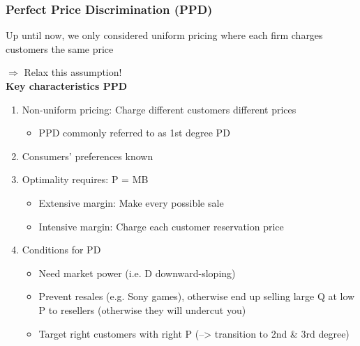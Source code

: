 \documentclass[10pt]{beamer}
\begin{document}
\begin{frame} 
	\frametitle{Perfect Price Discrimination (PPD)}
	
	Up until now, we only considered uniform pricing where each firm charges customers the same price
	
	\smallskip
	$\Longrightarrow$ Relax this assumption!\\
	\bigskip
	\textbf{Key characteristics PPD}
	\begin{enumerate}
		\item Non-uniform pricing: Charge different customers different prices
			\begin{itemize}
				\item PPD commonly referred to as 1st degree PD
			\end{itemize}
		\item Consumers' preferences known
		\item Optimality requires: P = MB %
			\begin{itemize}
				\item Extensive margin: Make every possible sale
				\item Intensive margin: Charge each customer reservation price %
			\end{itemize}
		\item Conditions for PD
		\begin{itemize}
			\item Need market power (i.e. D downward-sloping)
			\item Prevent resales (e.g. Sony games), otherwise end up selling large Q at low P to resellers (otherwise they will undercut you)
			\item Target right customers with right P (--> transition to 2nd \& 3rd degree)
		\end{itemize}
	\end{enumerate}
	
\end{frame}
\end{document}
